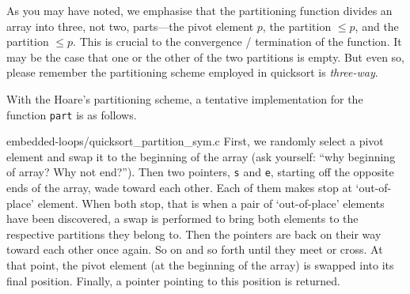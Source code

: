 \documentclass[oneside,11pt]{book}
\theoremstyle{definition}
\theoremstyle{remark}
\newcommand{\code}[1]{\mbox{\lstinline{#1}}}
\begin{document}
As you may have noted, we emphasise that the partitioning function divides an array into three, not
two, parts---the pivot element $p$, the partition $\leq p$, and the partition $\leq p$.
This is crucial to the convergence / termination of the function.
It may be the case that one or the other of the two partitions is empty.
But even so, please remember the partitioning scheme employed in quicksort is \emph{three-way}.


With the Hoare's partitioning scheme, a tentative implementation for the function \code{part} is as
follows.

{embedded-loops/quicksort_partition_sym.c}
First, we randomly select a pivot element and swap it to the beginning of the array
(ask yourself: ``why beginning of array?
Why not end?'').
Then two pointers, \code{s} and \code{e}, starting off the opposite ends of the array,
wade toward each other.
Each of them makes stop at `out-of-place' element.
When both stop, that is when a pair of `out-of-place' elements have been discovered,
a swap is performed to bring both elements to the respective partitions they belong to.
Then the pointers are back on their way toward each other once again.
So on and so forth until they meet or cross.
At that point, the pivot element (at the beginning of the array) is swapped into its final position.
Finally, a pointer pointing to this position is returned.
\end{document}
